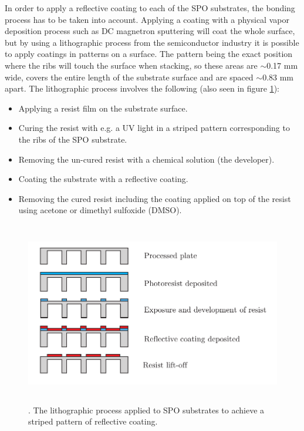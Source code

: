 In order to apply a reflective coating to each of the SPO substrates, the bonding process has to be taken into account. Applying a coating with a physical vapor deposition process such as DC magnetron sputtering will coat the whole surface, but by using a lithographic process from the semiconductor industry it is possible to apply coatings in patterns on a surface. The pattern being the exact position where the ribs will touch the surface when stacking, so these areas are $\sim$0.17 mm wide, covers the entire length of the substrate surface and are spaced $\sim$0.83 mm apart. The lithographic process involves the following (also seen in figure \ref{fig:litho_process}):

\begin{itemize}
  \item Applying a resist film on the substrate surface.
  \item Curing the resist with e.g. a UV light in a striped pattern corresponding to the ribs of the SPO substrate.
  \item Removing the un-cured resist with a chemical solution (the developer).
  \item Coating the substrate with a reflective coating.
  \item Removing the cured resist including the coating applied on top of the resist using acetone or dimethyl sulfoxide (DMSO).
\end{itemize}

\begin{figure}[!h]
  \center
  \includegraphics[height=8cm]{figures/athena/litho_process_new.pdf}
\caption{\footnotesize. The lithographic process applied to SPO substrates to achieve a striped pattern of reflective coating.}\label{fig:litho_process}
\end{figure}

